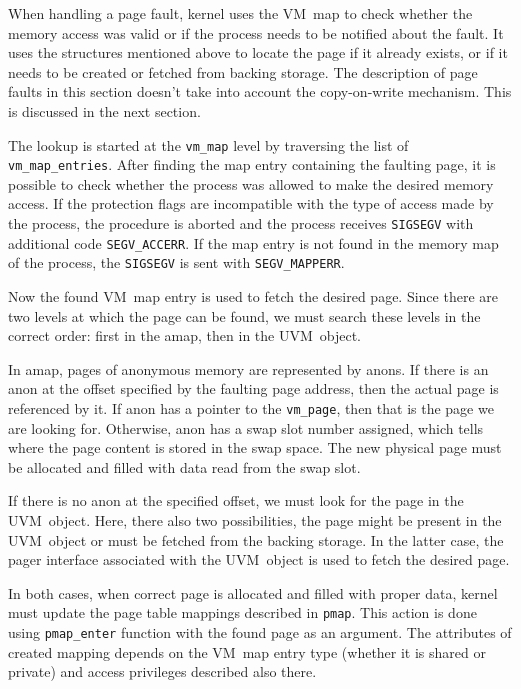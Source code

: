 When handling a page fault, kernel uses the VM~map to check whether the memory access was valid or if the process needs to be notified about the fault.
It uses the structures mentioned above to locate the page if it already exists, or if it needs to be created or fetched from backing storage.
The description of page faults in this section doesn't take into account the copy-on-write mechanism.
This is discussed in the next section.

The lookup is started at the \texttt{vm_map} level by traversing the list of \texttt{vm_map_entries}.
After finding the map entry containing the faulting page,
it is possible to check whether the process was allowed to make the desired memory access.
If the protection flags are incompatible with the type of access made by the process,
the procedure is aborted and the process receives \texttt{SIGSEGV} with additional code \texttt{SEGV_ACCERR}.
If the map entry is not found in the memory map of the process,
the \texttt{SIGSEGV} is sent with \texttt{SEGV_MAPPERR}.

Now the found VM~map entry is used to fetch the desired page.
Since there are two levels at which the page can be found,
we must search these levels in the correct order: first in the amap, then in the UVM~object.

In amap, pages of anonymous memory are represented by anons.
If there is an anon at the offset specified by the faulting page address, then the actual page is referenced by it.
If anon has a pointer to the \texttt{vm_page}, then that is the page we are looking for.
Otherwise, anon has a swap slot number assigned, which tells where the page content is stored in the swap space.
The new physical page must be allocated and filled with data read from the swap slot.

If there is no anon at the specified offset, we must look for the page in the UVM~object.
Here, there also two possibilities, the page might be present in the UVM~object or must be fetched from the backing storage.
In the latter case, the pager interface associated with the UVM~object is used to fetch the desired page.

In both cases, when correct page is allocated and filled with proper data, kernel must update the page table mappings described in \texttt{pmap}.
This action is done using \texttt{pmap_enter} function with the found page as an argument.
The attributes of created mapping depends on the VM~map entry type (whether it is shared or private) and access privileges described also there.

